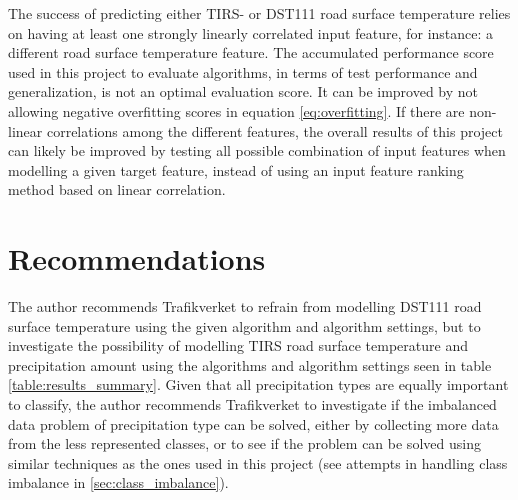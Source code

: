 	The success of predicting either TIRS- or DST111 road surface temperature relies on having at least one strongly linearly correlated input feature, for instance: a different road surface temperature feature. The accumulated performance score used in this project to evaluate algorithms, in terms of test performance and generalization, is not an optimal evaluation score. It can be improved by not allowing negative overfitting scores in equation \ref{eq:overfitting}. If there are non-linear correlations among the different features, the overall results of this project can likely be improved by testing all possible combination of input features when modelling a given target feature, instead of using an input feature ranking method based on linear correlation.

\section{Recommendations}
		The author recommends Trafikverket to refrain from modelling DST111 road surface temperature using the given algorithm and algorithm settings, but to investigate the possibility of modelling TIRS road surface temperature and precipitation amount using the algorithms and algorithm settings seen in table \ref{table:results_summary}. Given that all precipitation types are equally important to classify, the author recommends Trafikverket to investigate if the imbalanced data problem of precipitation type can be solved, either by collecting more data from the less represented classes, or to see if the problem can be solved using similar techniques as the ones used in this project (see attempts in handling class imbalance in \ref{sec:class_imbalance}). 